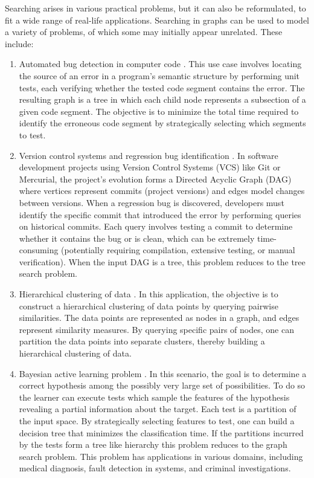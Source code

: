 Searching arises in various practical problems, but it can also be reformulated, to fit a wide range of real-life applications. Searching in graphs can be used to model a variety of problems, of which some may initially appear unrelated. These include: 
\begin{enumerate}
    \item Automated bug detection in computer code \cite{OptimalSinT,dereniowski2022CFApproxAlgForBSInTsWithMonoQTimes,dereniowski2024SInTsMonoQTs,szyfelbein2025searchingtreeskupmodularweight}. This use case involves locating the source of an error in a program's semantic structure by performing unit tests, each verifying whether the tested code segment contains the error. The resulting graph is a tree in which each child node represents a subsection of a given code segment. The objective is to minimize the total time required to identify the erroneous code segment by strategically selecting which segments to test. 
    \item Version control systems and regression bug identification \cite{10.1007/978-3-031-20624-5_10}. In software development projects using Version Control Systems (VCS) like Git or Mercurial, the project's evolution forms a Directed Acyclic Graph (DAG) where vertices represent commits (project versions) and edges model changes between versions. When a regression bug is discovered, developers must identify the specific commit that introduced the error by performing queries on historical commits. Each query involves testing a commit to determine whether it contains the bug or is clean, which can be extremely time-consuming (potentially requiring compilation, extensive testing, or manual verification). When the input DAG is a tree, this problem reduces to the tree search problem.
        \item Hierarchical clustering of data \cite{Acostfunctionforsimilaritybasedhierarchicalclustering,HCObjFsandAlgs,Approximatehierarchicalclusteringviasparsestcutandspreadingmetrics}. In this application, the objective is to construct a hierarchical clustering of data points by querying pairwise similarities. The data points are represented as nodes in a graph, and edges represent similarity measures. By querying specific pairs of nodes, one can partition the data points into separate clusters, thereby building a hierarchical clustering of data.
        \item Bayesian active learning problem \cite{BayesianLearnerOptimalNoisyBinarySearch,Cicalese2016DecTreesSimEval,ATightAnalysisofGreedy,Tradingoff,QuerySelection,CarmoSInRandPOSets,OnanOptimalSplitTreeProblem,Diagnosisdetermination,Karbasi2013Constrained}. In this scenario, the goal is to determine a correct hypothesis among the possibly very large set of possibilities. To do so the learner can execute tests which sample the features of the hypothesis revealing a partial information about the target. Each test is a partition of the input space. By strategically selecting features to test, one can build a decision tree that minimizes the classification time. If the partitions incurred by the tests form a tree like hierarchy this problem reduces to the graph search problem. This problem has applications in various domains, including medical diagnosis, fault detection in systems, and criminal investigations.

\end{enumerate}
